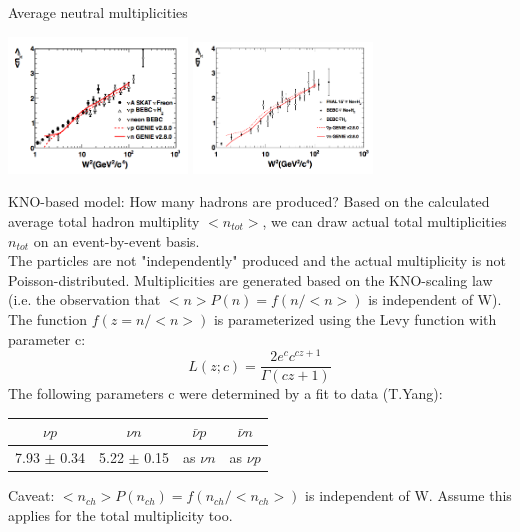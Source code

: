 \begin{frame}{Average neutral multiplicities}
\begin{center}
\includegraphics[width=180px]{./images/nuint/dis/avgnpi0_vs_W2.png}
\includegraphics[width=180px]{./images/nuint/dis/avgnpi0_vs_W2_nubar.png}\\
\end{center}
\end{frame}


\begin{frame}{KNO-based model: How many hadrons are produced?}
Based on the calculated average total hadron multiplity $<n_{tot}>$, we can draw actual total multiplicities $n_{tot}$ on an event-by-event basis.\\
The particles are not "independently" produced and the actual multiplicity is not Poisson-distributed.
Multiplicities are generated based on the KNO-scaling law (i.e. the observation that $<n>P(n) = f(n/<n>)$ is independent of W).\\
The function $f(z=n/<n>)$ is parameterized using the Levy function with parameter c:
\[
L(z;c) = \frac{2e^{c}c^{cz+1}}{\Gamma(cz+1)}
\]
The following parameters c were determined by a fit to data (T.Yang):\\
\begin{table}[ht]
\centering
\begin{tabular}{| c | c | c | c |}
\hline
  ${\nu}p$         & ${\nu}n$          &  ${\bar{\nu}}p$  & ${\bar{\nu}}n$ \\
\hline
  7.93 $\pm$ 0.34  & 5.22 $\pm$ 0.15   &  as ${\nu}n$     & as ${\nu}p$    \\
\hline
\end{tabular}
\end{table}
Caveat: $<n_{ch}>P(n_{ch}) = f(n_{ch}/<n_{ch}>)$ is independent of W. Assume this applies for the total multiplicity too.
\end{frame}

